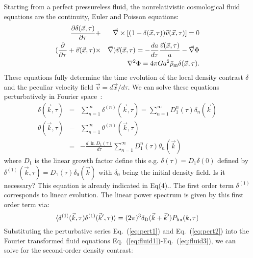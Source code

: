 \documentclass[prd,amsmath,amssymb,floatfix,superscriptaddress,nofootinbib,twocolumn]{revtex4-1}
\def\be{\begin{equation}}
\def\ee{\end{equation}}
\def\bea{\begin{eqnarray}}
\def\eea{\end{eqnarray}}
\newcommand{\vs}{\nonumber\\}
\newcommand{\vk}{\vec{k}}
\newcommand{\ec}[1]{Eq.~(\ref{eq:#1})}
\newcommand{\eql}[1]{\label{eq:#1}}
\newcommand{\peikai}[1]{{\color{blue} #1}}
\newcommand{\RC}[1]{{\color{darkorange} #1}}
\begin{document}
\label{sec1}
Starting from a perfect pressureless fluid, the nonrelativistic cosmological fluid equations are the continuity, Euler and Poisson equations:
\bea
\frac{\partial \delta(\vec{x},\tau)}{\partial \tau} &+&\vec{\nabla}\times [(1+\delta(\vec{x},\tau))\vec{v}(\vec{x},\tau)] =0\eql{fluid1} \\
(\frac{\partial}{\partial \tau} +\vec{v}(\vec{x},\tau)&\times&\vec{\nabla})\vec{v}(\vec{x},\tau)=-\frac{da}{d\tau}\frac{\vec{v}(\vec{x},\tau)}{a}-\vec{\nabla}\Phi \eql{eulereq}\\
&&\nabla^2 \Phi = 4\pi G a^2 \bar{\rho}_{\rm m} \delta(\vec{x},\tau) .\eql{fluid3}
\eea
These equations fully determine the time evolution of the local density contrast $\delta$ and the peculiar velocity field $\vec{v}=d\vec{x}/d\tau$.
We can solve these equations perturbatively in Fourier space~\cite{Bernardeau:2002rev}:
\bea
{\delta}(\vk,\tau) &=&\sum_{n=1}^{\infty} {\delta}^{(n)}(\vk,\tau)=\sum_{n=1}^{\infty}D_1^{n}(\tau)\delta_{n}(\vk)  \eql{pert1}\\
{\theta}(\vk,\tau)&=&\sum_{n=1}^{\infty}{\theta}^{(n)}(\vk,\tau) \vs
&=&-\frac{d\,\ln D_1(\tau)}{d\tau}\sum_{n=1}^{\infty}D_1^{n}(\tau)\theta_{n}(\vk) \eql{pert2}
\eea
where $D_1$ is the linear growth factor \RC{define this e.g. $\delta(\tau)=D_{1}\delta(0)$} \peikai{defined by $\delta^{(1)}(\vk,\tau)=D_{1}(\tau)\delta_{0}(\vk)$ with $\delta_0$ being the initial density field. Is it necessary? This equation is already indicated in Eq(4).}. The first order term ${\delta}^{(1)}$ corresponds to linear evolution. The linear power spectrum is given by this first order term via:
\be 
\langle {\delta^{(1)}}(\vk,\tau){\delta^{(1)}}(\vk',\tau) \rangle =(2\pi)^3 \delta_{\rm D}(\vk+\vk')P_{\rm lin}(k,\tau) \eql{lin}
\ee 
Substituting the perturbative series \ec{pert1} and \ec{pert2} into the Fourier transformed fluid equations \ec{fluid1}-\ec{fluid3}, we can solve for the second-order density contrast:
\end{document}
